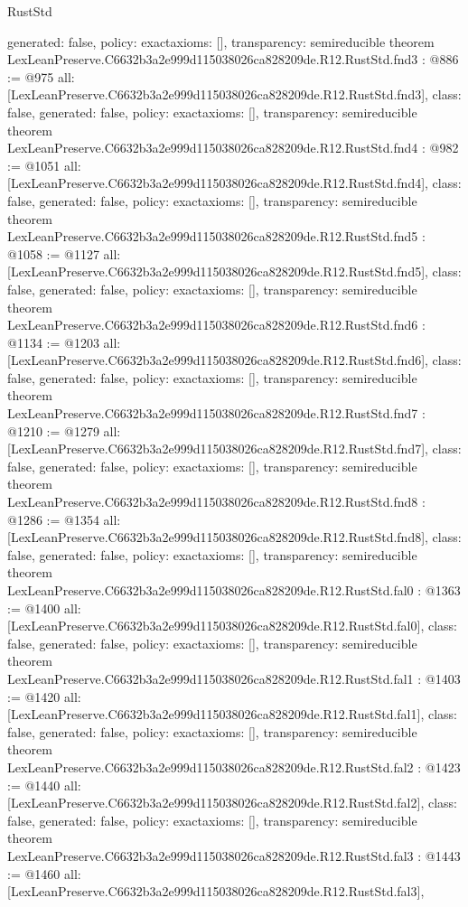 \begin{lexlean}{RustStd}
\begin{coremodule}
{  generated: false,
  policy: exact{axioms: []},
  transparency: semireducible
}
theorem LexLeanPreserve.C6632b3a2e999d115038026ca828209de.R12.RustStd.fnd3 : @886 := @975 {
  all: [LexLeanPreserve.C6632b3a2e999d115038026ca828209de.R12.RustStd.fnd3],
  class: false,
  generated: false,
  policy: exact{axioms: []},
  transparency: semireducible
}
theorem LexLeanPreserve.C6632b3a2e999d115038026ca828209de.R12.RustStd.fnd4 : @982 := @1051 {
  all: [LexLeanPreserve.C6632b3a2e999d115038026ca828209de.R12.RustStd.fnd4],
  class: false,
  generated: false,
  policy: exact{axioms: []},
  transparency: semireducible
}
theorem LexLeanPreserve.C6632b3a2e999d115038026ca828209de.R12.RustStd.fnd5 : @1058 := @1127 {
  all: [LexLeanPreserve.C6632b3a2e999d115038026ca828209de.R12.RustStd.fnd5],
  class: false,
  generated: false,
  policy: exact{axioms: []},
  transparency: semireducible
}
theorem LexLeanPreserve.C6632b3a2e999d115038026ca828209de.R12.RustStd.fnd6 : @1134 := @1203 {
  all: [LexLeanPreserve.C6632b3a2e999d115038026ca828209de.R12.RustStd.fnd6],
  class: false,
  generated: false,
  policy: exact{axioms: []},
  transparency: semireducible
}
theorem LexLeanPreserve.C6632b3a2e999d115038026ca828209de.R12.RustStd.fnd7 : @1210 := @1279 {
  all: [LexLeanPreserve.C6632b3a2e999d115038026ca828209de.R12.RustStd.fnd7],
  class: false,
  generated: false,
  policy: exact{axioms: []},
  transparency: semireducible
}
theorem LexLeanPreserve.C6632b3a2e999d115038026ca828209de.R12.RustStd.fnd8 : @1286 := @1354 {
  all: [LexLeanPreserve.C6632b3a2e999d115038026ca828209de.R12.RustStd.fnd8],
  class: false,
  generated: false,
  policy: exact{axioms: []},
  transparency: semireducible
}
theorem LexLeanPreserve.C6632b3a2e999d115038026ca828209de.R12.RustStd.fal0 : @1363 := @1400 {
  all: [LexLeanPreserve.C6632b3a2e999d115038026ca828209de.R12.RustStd.fal0],
  class: false,
  generated: false,
  policy: exact{axioms: []},
  transparency: semireducible
}
theorem LexLeanPreserve.C6632b3a2e999d115038026ca828209de.R12.RustStd.fal1 : @1403 := @1420 {
  all: [LexLeanPreserve.C6632b3a2e999d115038026ca828209de.R12.RustStd.fal1],
  class: false,
  generated: false,
  policy: exact{axioms: []},
  transparency: semireducible
}
theorem LexLeanPreserve.C6632b3a2e999d115038026ca828209de.R12.RustStd.fal2 : @1423 := @1440 {
  all: [LexLeanPreserve.C6632b3a2e999d115038026ca828209de.R12.RustStd.fal2],
  class: false,
  generated: false,
  policy: exact{axioms: []},
  transparency: semireducible
}
theorem LexLeanPreserve.C6632b3a2e999d115038026ca828209de.R12.RustStd.fal3 : @1443 := @1460 {
  all: [LexLeanPreserve.C6632b3a2e999d115038026ca828209de.R12.RustStd.fal3],
}
\end{coremodule}
\end{lexlean}
